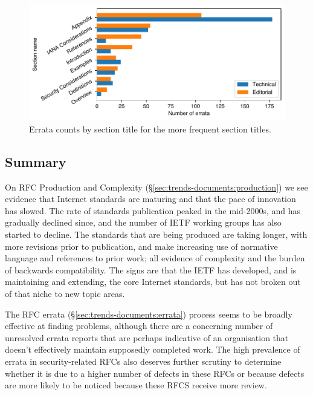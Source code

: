 \documentclass[twocolumn,10pt]{article}
\newlength{\figureWidthOneColumn}
\begin{document}
\begin{figure}
  \centering
  \includegraphics[width=\figureWidthOneColumn]{figures-prev/tma-2023/section-title-counts.pdf}
  \caption{
    Errata counts by section title for the more frequent section titles.
  }
  \label{fig:errata_section_wise_counts}
\end{figure}

\subsection{Summary}

On RFC Production and Complexity (\S\ref{sec:trends-documents:production})
we see evidence that Internet standards are maturing and that the pace of
innovation has slowed. The rate of standards publication peaked in the
mid-2000s, and has gradually declined since, and the number of IETF working
groups has also started to decline. The standards that are being produced
are taking longer, with more revisions prior to publication, and make
increasing use of normative language and references to prior work; all
evidence of complexity and the burden of backwards compatibility. The signs
are that the IETF has developed, and is maintaining and extending, the core
Internet standards, but has not broken out of that niche to new topic areas.


The RFC errata (\S\ref{sec:trends-documents:errata}) process seems to be
broadly effective at finding problems, although there are a concerning
number of unresolved errata reports that are perhaps indicative of an
organisation that doesn't effectively maintain supposedly completed work.
The high prevalence of errata in security-related RFCs also deserves
further scrutiny to determine whether it is due to a higher number of
defects in these RFCs or because defects are more likely to be noticed
because these RFCS receive more review.
\end{document}

